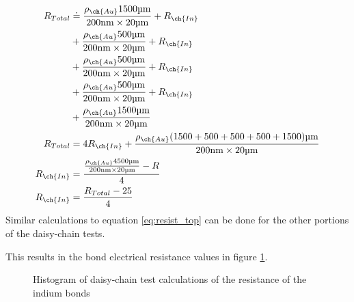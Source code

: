 \begin{equation}
    \begin{split}
        R_{Total}   &\doteq \frac{\rho_{\ch{Au}} 1500 \um}{200\nm \times 20\um} + R_{\ch{In}} \\
                    &+ \frac{\rho_{\ch{Au}} 500 \um}{200\nm \times 20\um} + R_{\ch{In}} \\
                    &+ \frac{\rho_{\ch{Au}} 500 \um}{200\nm \times 20\um} + R_{\ch{In}} \\
                    &+ \frac{\rho_{\ch{Au}} 500 \um}{200\nm \times 20\um} + R_{\ch{In}} \\
                    &+ \frac{\rho_{\ch{Au}} 1500 \um}{200\nm \times 20\um} \\
        R_{Total}   &= 4 R_{\ch{In}} + \frac{\rho_{\ch{Au}} (1500 + 500 + 500 + 500 + 1500) \um}{200\nm \times 20\um} \\
        R_{\ch{In}} &= \frac{\frac{\rho_{\ch{Au}} 4500 \um}{200\nm \times 20\um} - R}{4} \\
        R_{\ch{In}} &= \frac{R_{Total} - 25}{4}
    \end{split}
    \label{eq:resist_top}
\end{equation}
Similar calculations to equation \ref{eq:resist_top} can be done for the other portions of the daisy-chain tests.

This results in the bond electrical resistance values in figure \ref{fig:histogram_resist}.

\begin{figure}
    \centering
    \caption{Histogram of daisy-chain test calculations of the resistance of the indium bonds}
    \label{fig:histogram_resist}
\end{figure}

